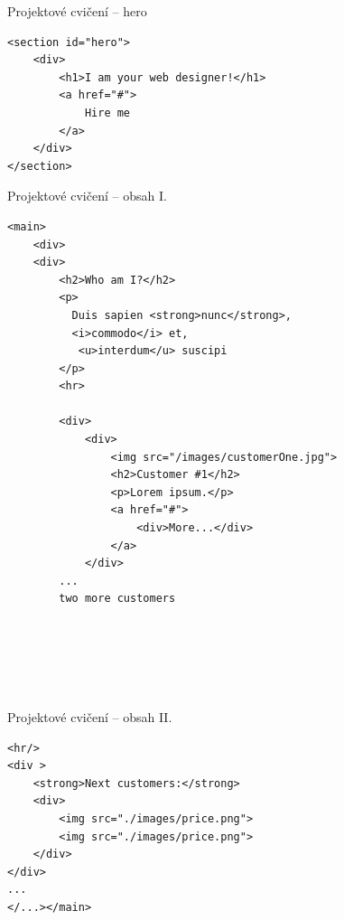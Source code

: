\documentclass{beamer}
\begin{document}
\begin{frame}[fragile, shrink=0]{Projektové cvičení -- hero}

\begin{lstlisting}[language=HTML5]
<section id="hero">
    <div>
        <h1>I am your web designer!</h1>
        <a href="#">
            Hire me
        </a>
    </div>
</section>
\end{lstlisting}
	
\end{frame}



\begin{frame}[fragile, shrink=0]{Projektové cvičení -- obsah I.}

\begin{lstlisting}[language=HTML5]
<main>
    <div>
    <div>
        <h2>Who am I?</h2>
        <p>
          Duis sapien <strong>nunc</strong>, 
          <i>commodo</i> et,
           <u>interdum</u> suscipi
        </p>
        <hr>

        <div>
            <div>
                <img src="/images/customerOne.jpg">
                <h2>Customer #1</h2>
                <p>Lorem ipsum.</p>
                <a href="#">
                    <div>More...</div>
                </a>
            </div>
        ...
        two more customers
       


     
        
\end{lstlisting}
	
\end{frame}

\begin{frame}[fragile, shrink=0]{Projektové cvičení -- obsah II.}

\begin{lstlisting}[language=HTML5]
<hr/>
<div >
    <strong>Next customers:</strong>
    <div>
        <img src="./images/price.png">
        <img src="./images/price.png">
    </div>
</div>
...
</...></main>
\end{lstlisting}
	
\end{frame}
\end{document}
